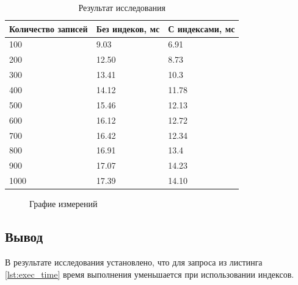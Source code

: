 \begin{table}[ht!]
	\centering
	\caption{Результат исследования}
	\label{tab:measure}
	\begin{tabular}{|p{4cm}|p{5cm}|p{5cm}|}
		\hline
		\textbf{Количество записей} & \textbf{Без индеков, мс} & \textbf{С индексами, мс} \\
		\hline
		100 & 9.03 & 6.91 \\
		\hline
		200 & 12.50 & 8.73 \\
		\hline
		300 & 13.41 & 10.3 \\
		\hline
		400 & 14.12 & 11.78 \\
		\hline
		500 & 15.46 & 12.13 \\
		\hline
		600 & 16.12 & 12.72 \\
		\hline
		700 & 16.42 & 12.34 \\
		\hline
		800 & 16.91 & 13.4 \\
		\hline
		900 & 17.07 & 14.23 \\
		\hline
		1000 & 17.39 & 14.10 \\
		\hline
	\end{tabular}
\end{table}

\begin{figure}[h!]
	\caption{Графие измерений}
	\label{fig:graph}
\end{figure}

\subsection{Вывод}

В результате исследования установлено, что для запроса из листинга \ref{lst:exec_time} время выполнения уменьшается при использовании индексов.

\pagebreak